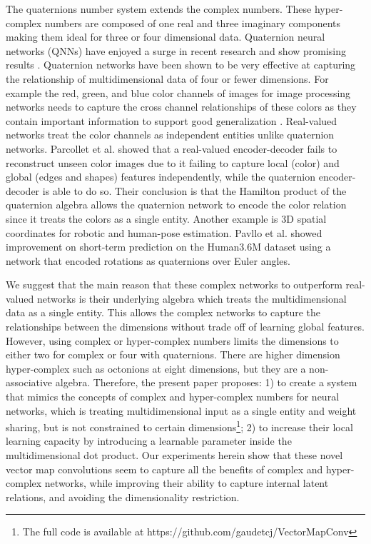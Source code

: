 \documentclass[14pt,a4paper]{article}
\begin{document}
The quaternions number system extends the complex numbers.
These hyper-complex numbers are composed of one real and three imaginary components making them ideal for three or four dimensional data.
Quaternion neural networks (QNNs) have enjoyed a surge in recent research and show promising results \cite{takahashi2017remarks, bayro2018geometric, Gaudet2018, parcollet2017deep, parcollet2017quaternion, parcollet2018quaternion-A, parcollet2018quaternion-B, parcollet2019quaternion}.
Quaternion networks have been shown to be very effective at capturing the relationship of multidimensional data of four or fewer dimensions.
For example the red, green, and blue color channels of images for image processing networks needs to capture the cross channel relationships of these colors as they contain important information to support good generalization \cite{kusamichi2004new, isokawa2003quaternion}.
Real-valued networks treat the color channels as independent entities unlike quaternion networks.
Parcollet et al. \cite{parcollet2019quaternion} showed that a real-valued encoder-decoder fails to reconstruct unseen color images due to it failing to capture local (color) and global (edges and shapes) features independently, while the quaternion encoder-decoder is able to do so.
Their conclusion is that the Hamilton product of the quaternion algebra allows the quaternion network to encode the color relation since it treats the colors as a single entity.
Another example is 3D spatial coordinates for robotic and human-pose estimation.
Pavllo et al. \cite{pavllo2018quaternet} showed improvement on short-term prediction on the Human3.6M dataset using a network that encoded rotations as quaternions over Euler angles.

We suggest that the main reason that these complex networks to outperform real-valued networks is their underlying algebra which treats the multidimensional data as a single entity.
This allows the complex networks to capture the relationships between the dimensions without trade off of learning global features.
However, using complex or hyper-complex numbers limits the dimensions to either two for complex or four with quaternions.
There are higher dimension hyper-complex such as octonions at eight dimensions, but they are a non-associative algebra.
Therefore, the present paper proposes: 1) to create a system that mimics the concepts of complex and hyper-complex numbers for neural networks, which is treating multidimensional input as a single entity and weight sharing, but is not constrained to certain dimensions\footnote{The full code is available at https://github.com/gaudetcj/VectorMapConv}; 2) to increase their local learning capacity by introducing a learnable parameter inside the multidimensional dot product. 
Our experiments herein show that these novel vector map convolutions seem to capture all the benefits of complex and hyper-complex networks, while improving their ability to capture internal latent relations, and avoiding the dimensionality restriction.
\end{document}
